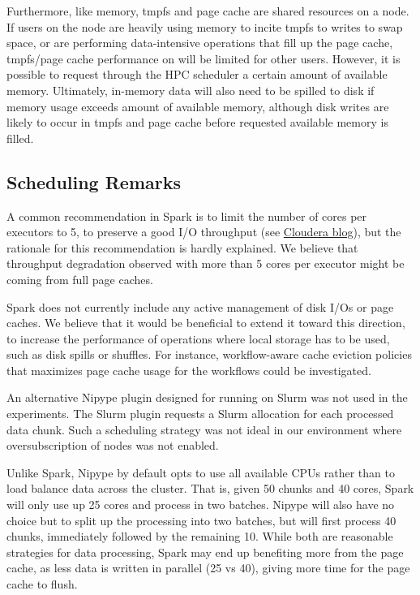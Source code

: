 Furthermore, like memory, tmpfs and page cache are shared resources on a node.
If users on the node are heavily using memory to incite tmpfs to writes to swap space, or are performing data-intensive operations
that fill up the page cache, tmpfs/page cache performance on will be limited for other users. 
However, it is possible to request through the HPC scheduler a certain
amount of available memory. Ultimately, in-memory data will also need to be spilled to
disk if memory usage exceeds amount of available memory, although disk writes are 
likely to occur in tmpfs and page cache before requested available memory is filled.

\subsection{Scheduling Remarks}

A common recommendation in Spark is to limit the number of cores per 
executors to 5, to preserve a good I/O 
throughput (see \href{http://blog.cloudera.com/blog/2015/03/how-to-tune-your-apache-spark-jobs-part-2}{Cloudera blog}), 
but the rationale for this recommendation is hardly explained. We 
believe that throughput degradation observed with more than 5 cores per 
executor might be coming from full page caches.

Spark does not currently include any active management of disk I/Os or 
page caches. We believe that it would be beneficial to extend it toward 
this direction, to increase the performance of operations where local 
storage has to be used, such as disk spills or shuffles. For instance, 
workflow-aware cache eviction policies that maximizes page cache usage 
for the workflows could be investigated. 

An alternative Nipype plugin designed for running on Slurm was not used 
in the experiments. The Slurm plugin requests a Slurm allocation for 
each processed data chunk. Such a scheduling strategy was not ideal in 
our environment where oversubscription of nodes was not enabled.

Unlike Spark, Nipype by default opts to use all available CPUs rather 
than to load balance data across the cluster. That is, given 50 chunks 
and 40 cores, Spark will only use up 25 cores and process in two batches.
Nipype will also have no choice 
but to split up the processing into two batches, but will first process 
40 chunks, immediately followed by the remaining 10. While both are 
reasonable strategies for data processing, Spark may end up benefiting 
more from the page cache, as less data is written in parallel (25 vs 
40), giving more time for the page cache to flush.

